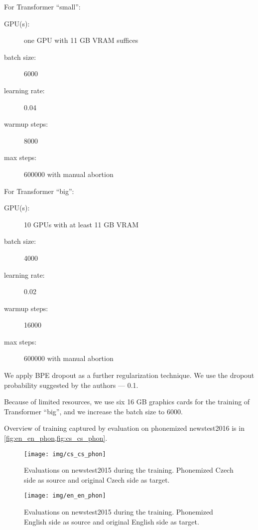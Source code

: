For Transformer ``small'':
\begin{description}
	\item[GPU(s):] one GPU with 11 GB VRAM suffices
	\item[batch size:] 6000
	\item[learning rate:] 0.04
	\item[warmup steps:] 8000
	\item[max steps:] 600000 with manual abortion
\end{description}

For Transformer ``big'':
\begin{description}
	\item[GPU(s):] 10 GPUs with at least 11 GB VRAM
	\item[batch size:] 4000
	\item[learning rate:] 0.02
	\item[warmup steps:] 16000
	\item[max steps:] 600000 with manual abortion
\end{description}

We apply BPE dropout  as a further regularization technique. We use the dropout probability suggested by the authors --- 0.1.

Because of limited resources, we use six 16 GB graphics cards for the training of Transformer ``big'', and we increase the batch size to 6000.

Overview of training captured by evaluation on phonemized newstest2016 is in \cref{fig:en_en_phon,fig:cs_cs_phon}.

\begin{figure*}[h]
	\texttt{[image: img/cs\_cs\_phon]}
	\caption{Evaluations on newstest2015 during the training. Phonemized Czech side as source and original Czech side as target.}
	\label{fig:cs_cs_phon}
\end{figure*}



\begin{figure*}[h]
	\texttt{[image: img/en\_en\_phon]}
	\caption{Evaluations on newstest2015 during the training. Phonemized English side as source and original English side as target.}
	\label{fig:en_en_phon}
\end{figure*}




